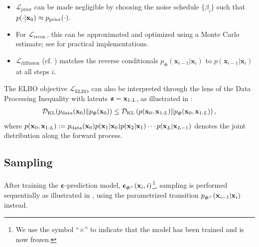 \begin{itemize}
    \item $\mathcal{L}_{\text{prior}}$ can be made negligible by choosing the noise schedule $\{\beta_i\}$ such that $p(\cdot|{\mathbf{x}}_0) \approx p_{\text{prior}}(\cdot)$.
    \item For $\mathcal{L}_{\text{recon.}}$, this can be approximated and optimized using a Monte Carlo estimate; see \citep{ho2020denoising, kingma2021variational} for practical implementations. 
    \item $\mathcal{L}_{\text{diffusion}}$ (cf. ) matches the reverse conditionals $p_{\bm{\phi}}(\mathbf{x}_{i-1}|\mathbf{x}_i)$ to $p(\mathbf{x}_{i-1}|\mathbf{x}_i)$ at all steps $i$.
\end{itemize}

The ELBO objective $\mathcal{L}_{\text{ELBO}}$ can also be interpreted through the lens of the Data Processing Inequality with latents ${\mathbf{z}} = {\mathbf{x}}_{1:L}$, as illustrated in :
\begin{align*}
    \mathcal{D}_{\mathrm{KL}}(p_{\mathrm{data}}({\mathbf{x}}_0) \| p_{\bm{\phi}}({\mathbf{x}}_0)) \leq \mathcal{D}_{\mathrm{KL}}\left(p({\mathbf{x}}_0, {\mathbf{x}}_{1:L}) \| p_{\bm{\phi}}({\mathbf{x}}_0, {\mathbf{x}}_{1:L})\right),
\end{align*}
where $p({\mathbf{x}}_0, {\mathbf{x}}_{1:L}) := p_{\mathrm{data}}({\mathbf{x}}_0)  p({\mathbf{x}}_1|{\mathbf{x}}_0)  p({\mathbf{x}}_2|{\mathbf{x}}_1) \cdots p({\mathbf{x}}_L|{\mathbf{x}}_{L-1})$ denotes the joint distribution along the forward process. 









\subsection{Sampling} 
After training the ${\bm{\epsilon}}$-prediction model, $\bm{\epsilon}_{\bm{\phi}^\times}({\mathbf{x}}_i, i)$\footnote{We use the symbol ``$\times$'' to indicate that the model has been trained and is now frozen.}, sampling is performed sequentially as illustrated in , using the parametrized transition $p_{\bm{\phi}^\times}({\mathbf{x}}_{i-1} | {\mathbf{x}}_i)$ instead.


